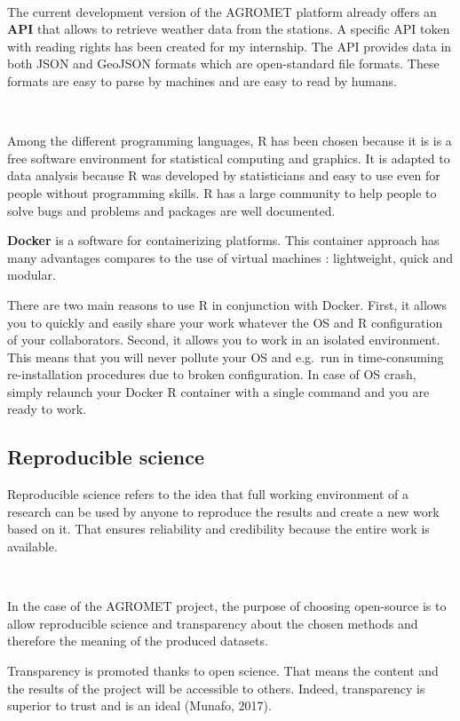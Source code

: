 \documentclass[12pt,twoside]{reedthesis}
\theoremstyle{definition}
\theoremstyle{definition}
\theoremstyle{definition}
\theoremstyle{remark}
\begin{document}
~

The current development version of the AGROMET platform already offers
an \textbf{API} that allows to retrieve weather data from the stations.
A specific API token with reading rights has been created for my
internship. The API provides data in both JSON and GeoJSON formats which
are open-standard file formats. These formats are easy to parse by
machines and are easy to read by humans.

~

Among the different programming languages, R has been chosen because it
is is a free software environment for statistical computing and
graphics. It is adapted to data analysis because R was developed by
statisticians and easy to use even for people without programming
skills. R has a large community to help people to solve bugs and
problems and packages are well documented.

\textbf{Docker} is a software for containerizing platforms. This
container approach has many advantages compares to the use of virtual
machines : lightweight, quick and modular.

There are two main reasons to use R in conjunction with Docker. First,
it allows you to quickly and easily share your work whatever the OS and
R configuration of your collaborators. Second, it allows you to work in
an isolated environment. This means that you will never pollute your OS
and e.g.~run in time-consuming re-installation procedures due to broken
configuration. In case of OS crash, simply relaunch your Docker R
container with a single command and you are ready to work.

\subsection{Reproducible science}\label{reproducible-science}

Reproducible science refers to the idea that full working environment of
a research can be used by anyone to reproduce the results and create a
new work based on it. That ensures reliability and credibility because
the entire work is available.

~

In the case of the AGROMET project, the purpose of choosing open-source
is to allow reproducible science and transparency about the chosen
methods and therefore the meaning of the produced datasets.

Transparency is promoted thanks to open science. That means the content
and the results of the project will be accessible to others. Indeed,
transparency is superior to trust and is an ideal (Munafo, 2017).
\end{document}

